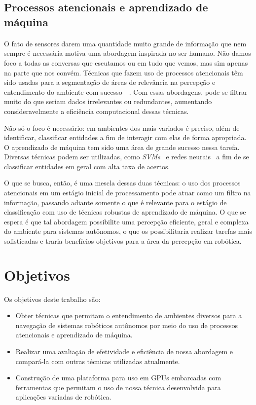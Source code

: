 \documentclass[11pt]{article}
\newcommand{\tit}[1]{\textit{#1}}
\begin{document}
\subsection{Processos atencionais e aprendizado de máquina}
\paragraph{}
O fato de sensores darem uma quantidade muito grande de informação que nem 
sempre é necessária motiva uma abordagem inspirada no ser humano.
Não damos foco a todas as conversas que escutamos ou em tudo que vemos, mas sim 
apenas na parte que nos convém. 
Técnicas que fazem uso de processos atencionais têm sido usadas para a 
segmentação de áreas de relevância na percepção e entendimento do 
ambiente com sucesso~\cite{bio}~\cite{esther}.
Com essas abordagens, pode-se filtrar muito do que seriam dados irrelevantes ou
redundantes, aumentando consideravelmente a eficiência computacional dessas
técnicas.

Não só o foco é necessário: em ambientes dos mais variados é preciso, além
de identificar, classificar entidades a fim de interagir com elas de forma
apropriada. 
O aprendizado de máquina tem sido uma área de grande sucesso nessa tarefa.
Diversas técnicas podem ser utilizadas, como \tit{SVMs}~\cite{svm} 
e redes neurais~\cite{nn} a fim de se classificar entidades em geral com 
alta taxa de acertos. 

O que se busca, então, é uma mescla dessas duas técnicas: o uso dos processos
atencionais em um estágio inicial de processamento pode atuar como um filtro
na informação, passando adiante somente o que é relevante para o estágio de
classificação com uso de técnicas robustas de aprendizado de máquina. 
O que se espera é que tal abordagem possibilite uma percepção eficiente, geral
e complexa do ambiente para sistemas autônomos, o que os possibilitaria 
realizar tarefas mais sofisticadas e traria benefícios objetivos para
a área da percepção em robótica.

\section{Objetivos}
\paragraph{}
Os objetivos deste trabalho são:
\begin{itemize}
	\item Obter técnicas que permitam o entendimento de ambientes
		diversos para a navegação de sistemas robóticos autônomos por meio 
		do uso de processos atencionais e aprendizado de máquina.
	\item Realizar uma avaliação de efetividade e eficiência de nossa abordagem
		e compará-la com outras técnicas utilizadas atualmente.
	\item Construção de uma plataforma para uso em GPUs embarcadas com 
		ferramentas que permitam o uso de nossa técnica desenvolvida para
		aplicações variadas de robótica.
\end{itemize}
\end{document}

